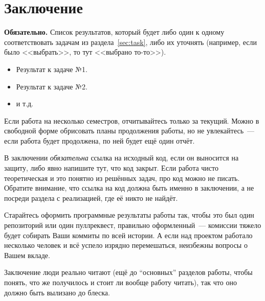 
\section*{Заключение}
\textbf{Обязательно.} Список результатов, который будет либо один к одному соответствовать задачам из раздела~\ref{sec:task}, либо их уточнять (например, если было <<выбрать>>, то тут <<выбрано то-то>>).

\begin{itemize}
    \item Результат к задаче №1.
    \item Результат к задаче №2.
    \item и т.д.
\end{itemize}
\noindent Если работа на несколько семестров, отчитывайтесь только за текущий.
Можно в свободной форме обрисовать планы продолжения работы, но не увлекайтесь~--- если работа будет продолжена, по ней будет ещё один отчёт.

В заключении \emph{обязательна} ссылка на исходный код, если он выносится на защиту, либо явно напишите тут, что код закрыт. Если работа чисто теоретическая и это понятно из решённых задач, про код можно не писать. Обратите внимание, что ссылка на код должна быть именно в заключении, а не посреди раздела с реализацией, где её никто не найдёт.

Старайтесь оформить программные результаты работы так, чтобы это был один репозиторий или один пуллреквест, правильно оформленный~--- комиссии тяжело будет собирать Ваши коммиты по всей истории. А если над проектом работало несколько человек и всё успело изрядно перемешаться, неизбежны вопросы о Вашем вкладе.

Заключение люди реально читают (ещё до \enquote{основных} разделов работы, чтобы понять, что же получилось и стоит ли вообще работу читать), так что оно должно быть вылизано до блеска.
